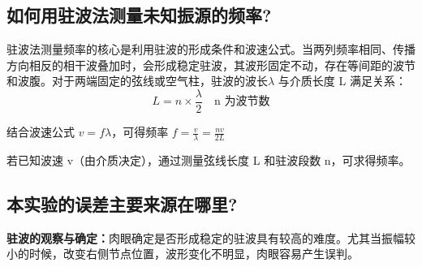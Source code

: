 \documentclass[]{../../templates/Report}%
\begin{document}
\begin{fullreportonly}
\subsection{如何用驻波法测量未知振源的频率?}
驻波法测量频率的核心是利用驻波的形成条件和波速公式。当两列频率相同、传播方向相反的相干波叠加时，会形成稳定驻波，其波形固定不动，存在等间距的波节和波腹。对于两端固定的弦线或空气柱，驻波的波长$\lambda$ 与介质长度 L 满足关系：
\[
L = n \times \frac{\lambda}{2} \quad \text{n 为波节数}
\]
\par
结合波速公式 $v = f \lambda$，可得频率 $f = \frac{v}{\lambda} = \frac{nv}{2L}$
\par
若已知波速 v（由介质决定），通过测量弦线长度 L 和驻波段数 n，可求得频率。
\subsection{本实验的误差主要来源在哪里?}
\textbf{驻波的观察与确定：}肉眼确定是否形成稳定的驻波具有较高的难度。尤其当振幅较小的时候，改变右侧节点位置，波形变化不明显，肉眼容易产生误判。

\end{fullreportonly}
\insertnotes
\end{document}
